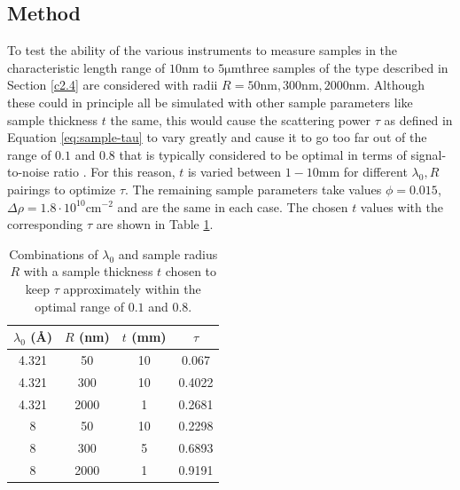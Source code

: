 \documentclass{article}
\newcommand{\targetrange}{$10 \unit{\nano\meter}$ to $5 \unit{\micro\meter}$}
\begin{document}

\subsection{Method}
To test the ability of the various instruments to measure samples in the characteristic length range of \targetrange three samples of the type described in Section \ref{c2.4} are considered with radii $R = 50\unit{\nano\meter}, 300\unit{\nano\meter}, 2000\unit{\nano\meter}$. Although these could in principle all be simulated with other sample parameters like sample thickness $t$ the same, this would cause the scattering power $\tau$ as defined in Equation \eqref{eq:sample-tau} to vary greatly and cause it to go too far out of the range of $0.1$ and $0.8$ that is typically considered to be optimal in terms of signal-to-noise ratio \cite{bouwman2021b}\cite{heijkamp2011}. For this reason, $t$ is varied between $1 - 10\unit{\milli\meter}$ for different $\lambda_0, R$ pairings to optimize $\tau$. The remaining sample parameters take values $\phi = 0.015$, $\Delta\rho = 1.8\cdot 10^{10} \unit{\centi\meter}^{-2}$ and are the same in each case. The chosen $t$ values with the corresponding $\tau$ are shown in Table \ref{tab:sample-thickness}.


\begin{table}[h!]
	\centering
	\begin{tabular}{|c|c|c|c|}
		\hline
		$\lambda_0$ (Å)  & $R$ (nm)  & $t$ (mm)& $\tau$ \\
		\hline
		4.321 & 50 & 10 & 0.067\\
		4.321 & 300 & 10 & 0.4022 \\
		4.321 & 2000 & 1 & 0.2681 \\
		8 & 50 & 10 & 0.2298 \\
		8 & 300 & 5 & 0.6893 \\
		8 & 2000 & 1 & 0.9191 \\
		\hline
	\end{tabular}
	\caption{Combinations of $\lambda_0$ and sample radius $R$ with a sample thickness $t$ chosen to keep $\tau$ approximately within the optimal range of $0.1$ and $0.8$.}
	\label{tab:sample-thickness}
\end{table}
\end{document}
